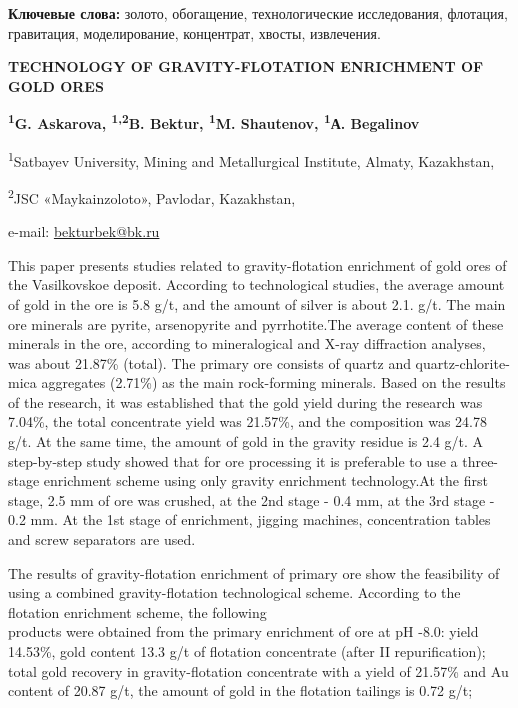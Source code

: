 {\bfseries Ключевые слова:} золото, обогащение, технологические
исследования, флотация, гравитация, моделирование, концентрат, хвосты,
извлечения.
\begin{articleheader}

{\bfseries TECHNOLOGY OF GRAVITY-FLOTATION ENRICHMENT OF GOLD ORES}

{\bfseries \textsuperscript{1}G. Askarova, \textsuperscript{1,2}B.
Bektur\textsuperscript{\envelope }, \textsuperscript{1}M. Shautenov,
\textsuperscript{1}А. Begalinov}
\end{articleheader}

\begin{affiliation}

\textsuperscript{1}Satbayev University, Mining and Metallurgical
Institute, Almaty, Kazakhstan,

\textsuperscript{2}JSC «Maykainzoloto», Pavlodar, Kazakhstan,

e-mail: \href{mailto:bekturbek@bk.run}{bekturbek@bk.ru}
\end{affiliation}

This paper presents studies related to gravity-flotation enrichment of
gold ores of the Vasilkovskoe deposit. According to technological
studies, the average amount of gold in the ore is 5.8 g/t, and the
amount of silver is about 2.1. g/t. The main ore minerals are pyrite,
arsenopyrite and pyrrhotite.The average content of these minerals in the
ore, according to mineralogical and X-ray diffraction analyses, was
about 21.87\% (total). The primary ore consists of quartz and
quartz-chlorite-mica aggregates (2.71\%) as the main rock-forming
minerals. Based on the results of the research, it was established that
the gold yield during the research was 7.04\%, the total concentrate
yield was 21.57\%, and the composition was 24.78 g/t. At the same time,
the amount of gold in the gravity residue is 2.4 g/t. A step-by-step
study showed that for ore processing it is preferable to use a
three-stage enrichment scheme using only gravity enrichment
technology.At the first stage, 2.5 mm of ore was crushed, at the 2nd
stage - 0.4 mm, at the 3rd stage - 0.2 mm. At the 1st stage of
enrichment, jigging machines, concentration tables and screw separators
are used.

The results of gravity-flotation enrichment of primary ore show the
feasibility of using a combined gravity-flotation technological scheme.
According to the flotation enrichment scheme, the following \\products
were obtained from the primary enrichment of ore at pH -8.0: yield
14.53\%, gold content 13.3 g/t of flotation concentrate (after II
repurification); total gold recovery in gravity-flotation concentrate
with a yield of 21.57\% and Au content of 20.87 g/t, the amount of gold
in the flotation tailings is 0.72 g/t;

